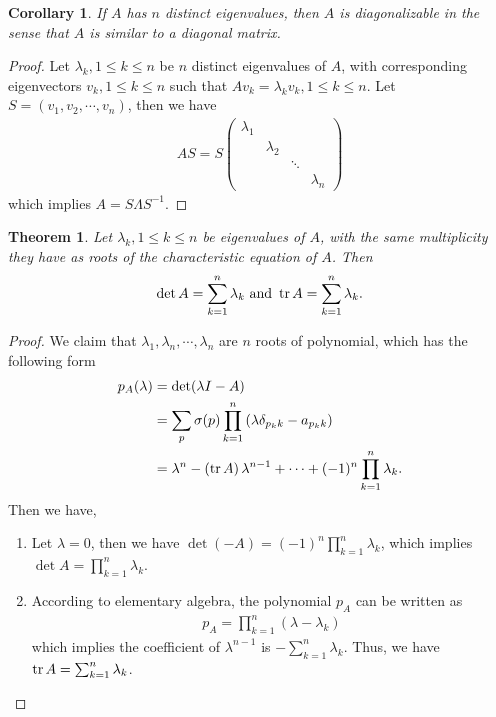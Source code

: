 \documentclass[11pt]{book}
\newtheorem{theorem}{Theorem}[section]
\newtheorem{corollary}{Corollary}[theorem]
\theoremstyle{definition}
\numberwithin{equation}{chapter}
\begin{document}
\medskip

\begin{corollary}
If $A$ has $n$ distinct eigenvalues, then $A$ is diagonalizable in the sense that $A$ is similar to a diagonal matrix.
\end{corollary}
\begin{proof}
Let $\lambda_k,1\leq k\leq n$ be $n$ distinct eigenvalues of $A$, with corresponding eigenvectors $v_k,1\leq k\leq n$ such that $Av_k = \lambda_k v_k,1\leq k\leq n$. Let $S = (v_1, v_2,\cdots, v_n)$, then we have
\begin{align*}
    AS = S \begin{pmatrix}
    \lambda_1 &  &  &  \\
     & \lambda_2 &  & \\
     &   & \ddots &  \\
     &  &  & \lambda_n
    \end{pmatrix}
\end{align*}
which implies $A = S\Lambda S^{-1}$.
\end{proof}

\medskip

\begin{theorem}
Let $\lambda_k,1\leq k\leq n$ be eigenvalues of $A$, with the same multiplicity they have as roots of the characteristic equation of $A$. Then 
\begin{align*}
    \det A = \sum^n_{k=1}\lambda_k \,\,\text{and}\,\, \tr A = \sum^n_{k=1}\lambda_k.
\end{align*}
\end{theorem}
\begin{proof}
We claim that $\lambda_1,\lambda_n,\cdots,\lambda_n$ are $n$ roots of polynomial, which has the following form
\begin{align*}
    p_A(\lambda) & = \det (\lambda I - A) \\
    & = \sum_p \sigma(p) \prod^n_{k=1} \left(\lambda \delta_{p_k k} - a_{p_k k}\right) \\
    & = \lambda^n - \left(\tr A \right)\lambda^{n-1} +\cdots + (-1)^n \prod^n_{k=1}\lambda_k.
\end{align*}
Then we have,
\begin{enumerate}[label=(\alph*)]
    \item Let $\lambda = 0$, then we have $\det (-A) = (-1)^n \prod^n_{k=1}\lambda_k$, which implies $\det A = \prod^n_{k=1}\lambda_k$.
    \item According to elementary algebra, the polynomial $p_A$ can be written as 
    \begin{align*}
        p_A = \prod^n_{k=1} (\lambda - \lambda_k)
    \end{align*}
    which implies the coefficient of $\lambda^{n-1}$ is $ - \sum^n_{k=1}\lambda_k$. Thus, we have $\tr A = \sum^n_{k=1}\lambda_k$.
\end{enumerate}
\end{proof}
\end{document}
